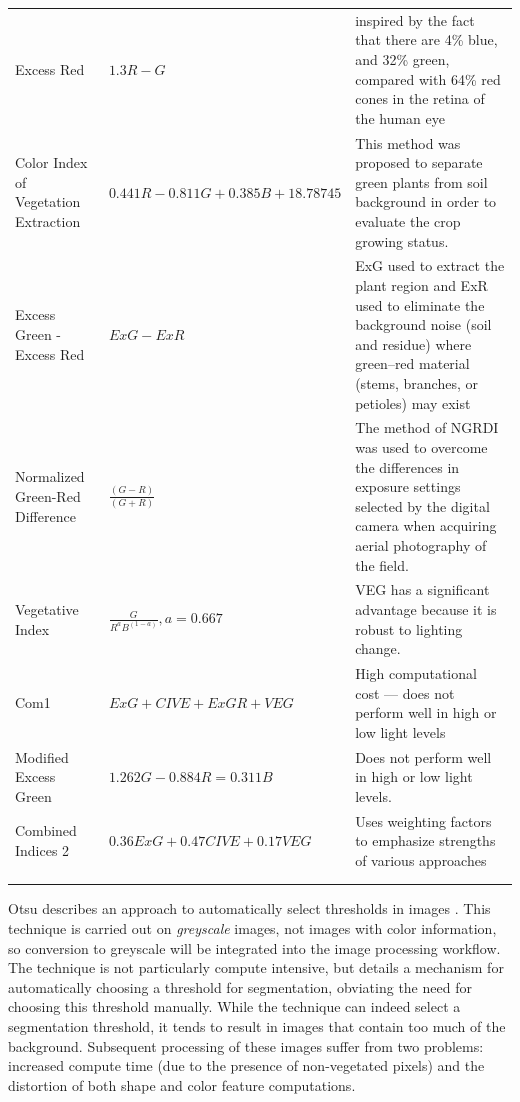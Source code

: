 \documentclass[12pt]{article}
\begin{document}
{{\begin{longtable}{x{\dimexpr.2\tabcolsep}
                  x{\dimexpr.4\tabcolsep}
                  x{\dimexpr.4\tabcolsep}}
		Excess Red      
		& $1.3 R - G$ 
		& inspired by the fact that there are 4\% blue, and 32\% green, compared with 64\% red cones in the retina of the human eye
\tabularnewline\addlinespace

		Color Index of Vegetation Extraction      
		& $0.441 R - 0.811 G + 0.385 B + 18.78745$
		& This method was proposed to separate green plants from soil background in order to evaluate the crop growing status.
\tabularnewline\addlinespace

		Excess Green - Excess Red   
		& $ExG - ExR$ 
		& ExG used to extract the plant region and ExR used to eliminate the background noise (soil and residue) where green–red material (stems, branches, or petioles) may exist
\tabularnewline\addlinespace

		Normalized Green-Red Difference    
		& $\frac {(G - R)} {(G + R)}$ 
		& The method of NGRDI was used to overcome the differences in exposure settings selected by the digital camera when acquiring aerial photography of the field. 
\tabularnewline\addlinespace

		Vegetative Index      
		& $\frac {G} {R^aB^{(1-a)}}, a = 0.667$ 
		& VEG has a significant advantage because it is robust to lighting change.
\tabularnewline\addlinespace

		Com1   
		& $ExG + CIVE + ExGR + VEG$ 
		& High computational cost --- does not perform well in high or low light levels
\tabularnewline\addlinespace

		Modified Excess Green      
		& $1.262G - 0.884R = 0.311B$ 
		& Does not perform well in high or low light levels. 
\tabularnewline\addlinespace

		Combined Indices 2      
		& $0.36ExG + 0.47CIVE + 0.17VEG$ 
		& Uses weighting factors to emphasize strengths of various approaches
\tabularnewline\addlinespace

\tabularnewline\addlinespace
\label{table:segmentation}
\end{longtable}
}	
Otsu describes an approach to automatically select thresholds in images \cite{Otsu1979-io}. This technique is carried out on \textit{greyscale} images, not images with color information, so conversion to greyscale will be integrated into the image processing workflow. The technique is not particularly compute intensive, but details a mechanism for automatically choosing a threshold for segmentation, obviating the need for choosing this threshold manually. While the technique can indeed select a segmentation threshold, it tends to result in images that contain too much of the background. Subsequent processing of these images suffer from two problems: increased compute time (due to the presence of non-vegetated pixels) and the distortion of both shape and color feature computations.


}
\end{document}
